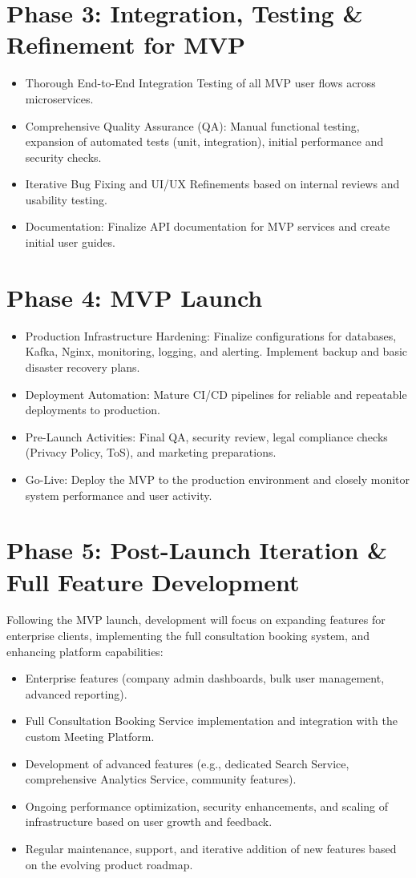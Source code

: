 \documentclass[12pt, a4paper]{report} %
\begin{document}
\begin{itemize}
\section{Phase 3: Integration, Testing \& Refinement for MVP}
  \begin{itemize}
    \item Thorough End-to-End Integration Testing of all MVP user flows across microservices.
    \item Comprehensive Quality Assurance (QA): Manual functional testing, expansion of automated tests (unit, integration), initial performance and security checks.
    \item Iterative Bug Fixing and UI/UX Refinements based on internal reviews and usability testing.
    \item Documentation: Finalize API documentation for MVP services and create initial user guides.
  \end{itemize}
\section{Phase 4: MVP Launch}
  \begin{itemize}
    \item Production Infrastructure Hardening: Finalize configurations for databases, Kafka, Nginx, monitoring, logging, and alerting. Implement backup and basic disaster recovery plans.
    \item Deployment Automation: Mature CI/CD pipelines for reliable and repeatable deployments to production.
    \item Pre-Launch Activities: Final QA, security review, legal compliance checks (Privacy Policy, ToS), and marketing preparations.
    \item Go-Live: Deploy the MVP to the production environment and closely monitor system performance and user activity.
  \end{itemize}
\section{Phase 5: Post-Launch Iteration & Full Feature Development}
  Following the MVP launch, development will focus on expanding features for enterprise clients, implementing the full consultation booking system, and enhancing platform capabilities:
  \begin{itemize}
    \item Enterprise features (company admin dashboards, bulk user management, advanced reporting).
    \item Full Consultation Booking Service implementation and integration with the custom Meeting Platform.
    \item Development of advanced features (e.g., dedicated Search Service, comprehensive Analytics Service, community features).
    \item Ongoing performance optimization, security enhancements, and scaling of infrastructure based on user growth and feedback.
    \item Regular maintenance, support, and iterative addition of new features based on the evolving product roadmap.
  \end{itemize}


\end{itemize}
\end{document}

